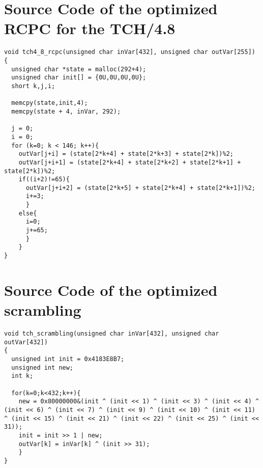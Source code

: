 \section{Source Code of the optimized RCPC for the TCH/4.8}
\label{sec:app_01}


\begin{lstlisting}[columns=flexible]
void tch4_8_rcpc(unsigned char inVar[432], unsigned char outVar[255])
{
  unsigned char *state = malloc(292+4);
  unsigned char init[] = {0U,0U,0U,0U};
  short k,j,i;
      
  memcpy(state,init,4);
  memcpy(state + 4, inVar, 292);

  j = 0;
  i = 0;
  for (k=0; k < 146; k++){
    outVar[j+i] = (state[2*k+4] + state[2*k+3] + state[2*k])%2;
    outVar[j+i+1] = (state[2*k+4] + state[2*k+2] + state[2*k+1] + state[2*k])%2;
    if((i+2)!=65){
      outVar[j+i+2] = (state[2*k+5] + state[2*k+4] + state[2*k+1])%2;
      i+=3;
      }
    else{
      i=0;
      j+=65;
      }
    }
}
\end{lstlisting}


\pagebreak

\section{Source Code of the optimized scrambling}
\label{sec:app_02}


\begin{lstlisting}[columns=flexible]
void tch_scrambling(unsigned char inVar[432], unsigned char outVar[432])
{
  unsigned int init = 0x4183E8B7;
  unsigned int new;
  int k;
       
  for(k=0;k<432;k++){
    new = 0x80000000&(init ^ (init << 1) ^ (init << 3) ^ (init << 4) ^ (init << 6) ^ (init << 7) ^ (init << 9) ^ (init << 10) ^ (init << 11) ^ (init << 15) ^ (init << 21) ^ (init << 22) ^ (init << 25) ^ (init << 31));
    init = init >> 1 | new;
    outVar[k] = inVar[k] ^ (init >> 31);
    }   
}
\end{lstlisting}



